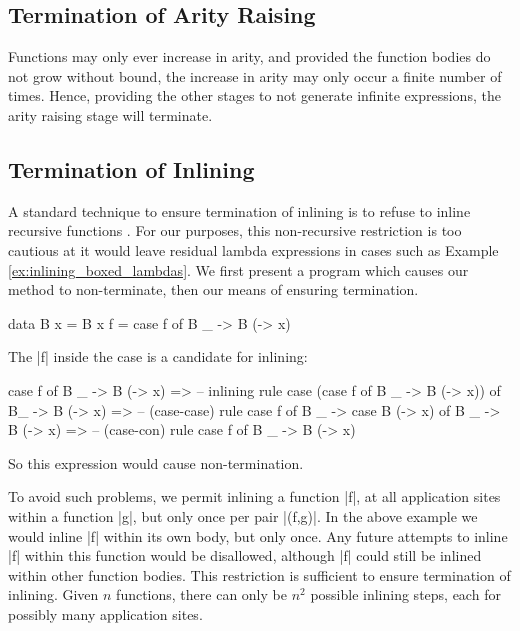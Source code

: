 \subsection{Termination of Arity Raising}

Functions may only ever increase in arity, and provided the function bodies do not grow without bound, the increase in arity may only occur a finite number of times. Hence, providing the other stages to not generate infinite expressions, the arity raising stage will terminate.

\subsection{Termination of Inlining}

A standard technique to ensure termination of inlining is to refuse to inline recursive functions \cite{spj:inlining}. For our purposes, this non-recursive restriction is too cautious at it would leave residual lambda expressions in cases such as Example \ref{ex:inlining_boxed_lambdas}. We first present a program which causes our method to non-terminate, then our means of ensuring termination.

\begin{example}
\begin{code}
data B x = B x
f = case  f of
          B _ -> B (\x -> x)
\end{code}

The |f| inside the case is a candidate for inlining:

\ignore\begin{code}
case f of B _ -> B (\x -> x)
    => -- inlining rule
case (case f of B _ -> B (\x -> x)) of B_ -> B (\x -> x)
    => -- (case-case) rule
case f of B _ -> case B (\x -> x) of B _ -> B (\x -> x)
    => -- (case-con) rule
case f of B _ -> B (\x -> x)
\end{code}

\noindent So this expression would cause non-termination.
\end{example}

To avoid such problems, we permit inlining a function |f|, at all application sites within a function |g|, but only once per pair |(f,g)|. In the above example we would inline |f| within its own body, but only once. Any future attempts to inline |f| within this function would be disallowed, although |f| could still be inlined within other function bodies. This restriction is sufficient to ensure termination of inlining. Given $n$ functions, there can only be $n^2$ possible inlining steps, each for possibly many application sites.


